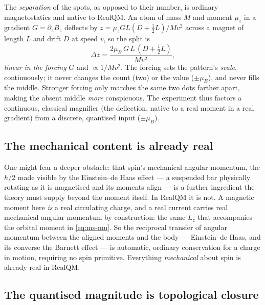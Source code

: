 The \emph{separation} of the spots, as opposed to their number, is ordinary magnetostatics and native to RealQM.
An atom of mass $M$ and moment $\mu_z$ in a gradient $G = \partial_z B_z$ deflects by
$z = \mu_z G L (D + \tfrac{1}{2}L)/M v^2$ across a magnet of length $L$ and drift $D$ at speed $v$, so the split
is
\begin{equation}
\Delta z = \frac{2\mu_B\, G\, L\, (D + \tfrac{1}{2}L)}{M v^2},
\label{eq:ms-spread}
\end{equation}
\emph{linear in the forcing} $G$ and $\propto 1/M v^2$. The forcing sets the pattern's \emph{scale},
continuously; it never changes the count (two) or the value ($\pm\mu_B$), and never fills the middle. Stronger
forcing only marches the same two dots farther apart, making the absent middle \emph{more} conspicuous. The
experiment thus factors a continuous, classical magnifier (the deflection, native to a real moment in a real
gradient) from a discrete, quantised input ($\pm\mu_B$).

\subsection*{The mechanical content is already real}

One might fear a deeper obstacle: that spin's mechanical angular momentum, the $\hbar/2$ made visible by the
Einstein--de Haas effect --- a suspended bar physically rotating as it is magnetised and its moments align --- is
a further ingredient the theory must supply beyond the moment itself. In RealQM it is not. A magnetic moment here
\emph{is} a real circulating charge, and a real current carries real mechanical angular momentum by construction:
the same $L_z$ that accompanies the orbital moment in \eqref{eq:ms-mu}. So the reciprocal transfer of angular
momentum between the aligned moments and the body --- Einstein--de Haas, and its converse the Barnett effect ---
is automatic, ordinary conservation for a charge in motion, requiring no spin primitive. Everything
\emph{mechanical} about spin is already real in RealQM.

\subsection*{The quantised magnitude is topological closure}

